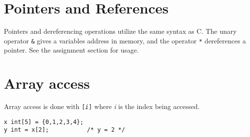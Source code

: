 	\section{Pointers and References}
		Pointers and dereferencing operations utilize the same syntax as C. The unary operator \texttt{\&} gives a variables address in memory, and the operator \texttt{*} dereferences a pointer. See the assignment section for usage.
		
	\section{Array access}
		Array access is done with \texttt{[\textit{i}]} where \textit{i} is the index being accessed. 
		
		\begin{lstlisting}
x int[5] = {0,1,2,3,4};
y int = x[2];  			/* y = 2 */
		\end{lstlisting}
